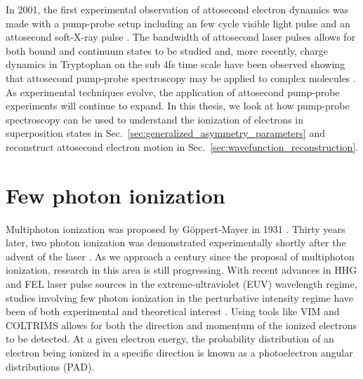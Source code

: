 In 2001, the first experimental observation of attosecond electron dynamics was made with a pump-probe setup including an few cycle visible light pulse and an attosecond soft-X-ray pulse \cite{hentschel2001}. The bandwidth of attosecond laser pulses allows for both bound and continuum states to be studied \cite{mauritsson2010} and, more recently, charge dynamics in Tryptophan on the sub 4fs time scale have been observed showing that attosecond pump-probe spectroscopy may be applied to complex molecules \cite{larasstiaso2018}. As experimental techniques evolve, the application of attosecond pump-probe experiments will continue to expand. In this thesis, we look at how pump-probe spectroscopy can be used to understand the ionization of electrons in superposition states in Sec.~\ref{sec:generalized_asymmetry_parameters} and reconstruct attosecond electron motion in Sec.~\ref{sec:wavefunction_reconstruction}.

\section{Few photon ionization} %
\label{sec:few_photon_ionization}
Multiphoton ionization was proposed by G\"oppert-Mayer in 1931 \cite{goppertmayer1931}. Thirty years later, two photon ionization was demonstrated experimentally shortly after the advent of the laser \cite{kaiser1961}. As we approach a century since the proposal of multiphoton ionization, research in this area is still progressing. With recent advances in HHG and FEL laser pulse sources in the extreme-ultraviolet (EUV) wavelength regime, studies involving few photon ionization in the perturbative intensity regime have been of both experimental and theoretical interest \cite{nikolopoulos2001,vanderhart2005,shakeshaft2007,pi2010,florescu2011,sato2011,haber2011,florescu2012,ishikawa2012,ishikawa2013,ma2013,rey2014,grum-grzhimailo2015,douguet2016,hofbrucker2017,hofbrucker2018,boll2019,wang2019}. Using tools like VIM and COLTRIMS allows for both the direction and momentum of the ionized electrons to be detected. At a given electron energy, the probability distribution of an electron being ionized in a specific direction is known as a photoelectron angular distributions (PAD). 

